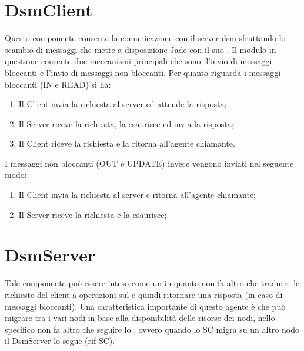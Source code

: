 \section{DsmClient}
Questo componente consente la comunicazione con il server dsm sfruttando lo scambio di messaggi che mette a disposizione Jade con il suo . Il modulo in questione consente due meccanismi principali che sono: l'invio di messaggi bloccanti e l'invio di messaggi non bloccanti. Per quanto riguarda i messaggi bloccanti (IN e READ) si ha:
\begin{enumerate}
	\item Il Client invia la richiesta al server ed attende la risposta;
	\item Il Server riceve la richiesta, la esaurisce ed invia la risposta;
	\item Il Client riceve la richiesta e la ritorna all'agente chiamante.
\end{enumerate}
I messaggi non bloccanti (OUT e UPDATE) invece vengono inviati nel seguente modo:
\begin{enumerate}
	\item Il Client invia la richiesta al server e ritorna all'agente chiamante;
	\item Il Server riceve la richiesta e la esaurisce;
\end{enumerate}
\section{DsmServer}
Tale componente può essere inteso come un  in quanto non fa altro che tradurre le richieste del client a operazioni sul  e quindi ritornare una risposta (in caso di messaggi bloccanti). Una caratteristica importante di questo agente è che può migrare tra i vari nodi in base alla disponibilità delle risorse dei nodi, nello specifico non fa altro che seguire lo , ovvero quando lo SC migra su un altro nodo il DsmServer lo segue (rif SC).